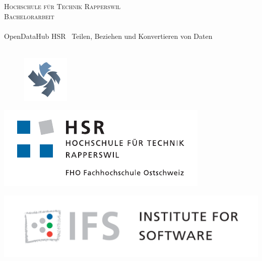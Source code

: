 
\author{
	\rlif \\
	\and
	\chuf \\
	\and
	\fscf \\
}

\clearpage
\begin{titlepage}
	
	\begin{center}
		\textsc{Hochschule für Technik Rapperswil} \\
		\textsc{Bachelorarbeit} \\ [25pt]
		\hr{0.5pt} \\[0.2cm]
		\huge OpenDataHub HSR \textendash\ Teilen, Beziehen und Konvertieren von Daten \\
		\hr{2pt} \\[0.3cm]
		
		\begin{figure}[H]
			\centering
			\includegraphics[width=0.2\textwidth]{fig/opendatahub-logo}
		\end{figure}
		
		\begin{minipage}{0.4\textwidth}
			\includegraphics[width=\textwidth]{fig/hsr-logo}
		\end{minipage}
		\begin{minipage}{0.4\textwidth}
			\includegraphics[width=\textwidth]{fig/ifs-logo}
		\end{minipage}
		

\end{center}
\end{titlepage}
